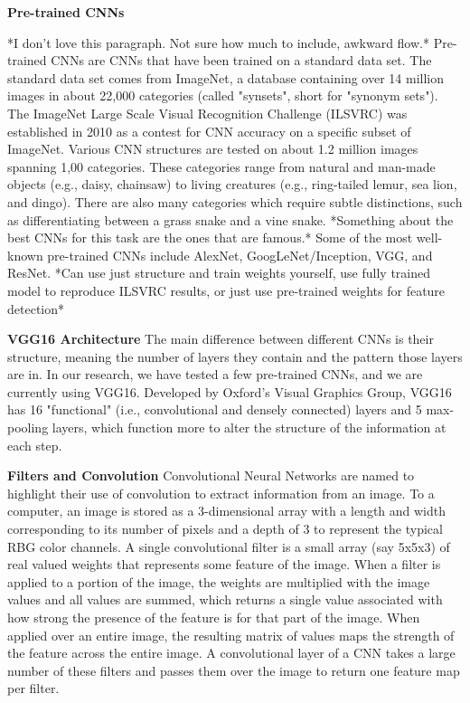 \documentclass{article}\usepackage[]{graphicx}\usepackage[]{color}
\begin{document}
\textbf{Pre-trained CNNs}


*I don't love this paragraph. Not sure how much to include, awkward flow.*
Pre-trained CNNs are CNNs that have been trained on a standard data set. The standard data set comes from ImageNet, a database containing over 14 million images in about 22,000 categories (called "synsets", short for "synonym sets"). The ImageNet Large Scale Visual Recognition Challenge (ILSVRC) was established in 2010 as a contest for CNN accuracy on a specific subset of ImageNet. Various CNN structures are tested on about 1.2 million images spanning 1,00 categories. These categories range from natural and man-made objects (e.g., daisy, chainsaw) to living creatures (e.g., ring-tailed lemur, sea lion, and dingo). There are also many categories which require subtle distinctions, such as differentiating between a grass snake and a vine snake. *Something about the best CNNs for this task are the ones that are famous.* Some of the most well-known pre-trained CNNs include AlexNet, GoogLeNet/Inception, VGG, and ResNet. *Can use just structure and train weights yourself, use fully trained model to reproduce ILSVRC results, or just use pre-trained weights for feature detection*

\textbf{VGG16 Architecture}
The main difference between different CNNs is their structure, meaning the number of layers they contain and the pattern those layers are in. In our research, we have tested a few pre-trained CNNs, and we are currently using VGG16. Developed by Oxford's Visual Graphics Group, VGG16 has 16 "functional" (i.e., convolutional and densely connected) layers and 5 max-pooling layers, which function more to alter the structure of the information at each step.

\textbf{Filters and Convolution}
Convolutional Neural Networks are named to highlight their use of convolution to extract information from an image. To a computer, an image is stored as a 3-dimensional array with a length and width corresponding to its number of pixels and a depth of 3 to represent the typical RBG color channels. A single convolutional filter is a small array (say 5x5x3) of real valued weights that represents some feature of the image. When a filter is applied to a portion of the image, the weights are multiplied with the image values and all values are summed, which returns a single value associated with how strong the presence of the feature is for that part of the image. When applied over an entire image, the resulting matrix of values maps the strength of the feature across the entire image. A convolutional layer of a CNN takes a large number of these filters and passes them over the image to return one feature map per filter. 
\end{document}

